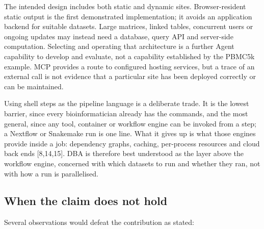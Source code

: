 \documentclass[11pt,a4paper]{article}
\begin{document}
The intended design includes both static and dynamic sites. Browser-resident
static output is the first demonstrated implementation; it avoids an
application backend for suitable datasets. Large matrices, linked tables,
concurrent users or ongoing updates may instead need a database, query
API and server-side computation. Selecting and operating that architecture
is a further Agent capability to develop and evaluate, not a capability
established by the PBMC5k example. MCP provides a route to configured
hosting services, but a trace of an external call is not evidence that a
particular site has been deployed correctly or can be maintained.

Using shell steps as the pipeline language is a deliberate trade. It is
the lowest barrier, since every bioinformatician already has the
commands, and the most general, since any tool, container or workflow
engine can be invoked from a step; a Nextflow or Snakemake run is one
line. What it gives up is what those engines provide inside a job:
dependency graphs, caching, per-process resources and cloud back ends
{[}8,14,15{]}. DBA is therefore best understood as the layer above the
workflow engine, concerned with which datasets to run and whether they
ran, not with how a run is parallelised.

\subsection{When the claim does not
hold}\label{when-the-claim-does-not-hold}

Several observations would defeat the contribution as stated:
\end{document}
